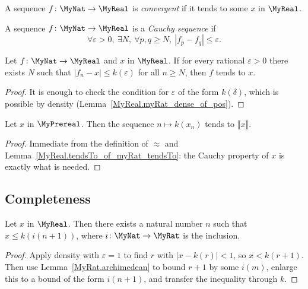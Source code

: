 \begin{definition}
    \label{MyReal.IsConvergent}
    \leanok
A sequence $f \colon \MyNat \to \MyReal$ is \emph{convergent} if it tends to some $x$ in $\MyReal$.
\end{definition}

\begin{definition}
    \label{MyReal.IsCauchy}
    \leanok
A sequence $f \colon \MyNat \to \MyReal$ is a \emph{Cauchy sequence} if
\[
\forall \varepsilon > 0, \ \exists N, \ \forall p, q \geq N, \ |f_p - f_q| \leq \varepsilon.
\]
\end{definition}

\begin{lemma}
    \label{MyReal.tendsTo_of_myRat_tendsTo}
    \leanok
    Let $f \colon \MyNat \to \MyReal$ and $x$ in $\MyReal$. If for every rational $\varepsilon > 0$
    there exists $N$ such that $|f_n - x| \leq k(\varepsilon)$ for all $n \geq N$, then $f$ tends to
    $x$.
\end{lemma}
\begin{proof}
    \leanok
    It is enough to check the condition for $\varepsilon$ of the form $k(\delta)$, which is possible
    by density (Lemma~\ref{MyReal.myRat_dense_of_pos}).
\end{proof}

\begin{lemma}
    \label{MyReal.tendsTo_myRat}
    \leanok
    Let $x$ in $\MyPrereal$. Then the sequence $n \mapsto k(x_n)$ tends to $⟦ x ⟧$.
\end{lemma}
\begin{proof}
    \leanok
    Immediate from the definition of $\approx$ and Lemma~\ref{MyReal.tendsTo_of_myRat_tendsTo}: the
    Cauchy property of $x$ is exactly what is needed.
\end{proof}

\subsection{Completeness}

\begin{lemma}
    \label{MyReal.archimedean}
    \leanok
    Let $x$ in $\MyReal$. Then there exists a natural number $n$ such that $x \leq k(i(n+1))$, where
    $i \colon \MyNat \to \MyRat$ is the inclusion.
\end{lemma}
\begin{proof}
    \leanok
    Apply density with $\varepsilon = 1$ to find $r$ with $|x-k(r)|<1$, so $x<k(r+1)$.
    Then use Lemma~\ref{MyRat.archimedean} to bound $r+1$ by some $i(m)$, enlarge this to a bound
    of the form $i(n+1)$, and transfer the inequality through $k$.
\end{proof}

